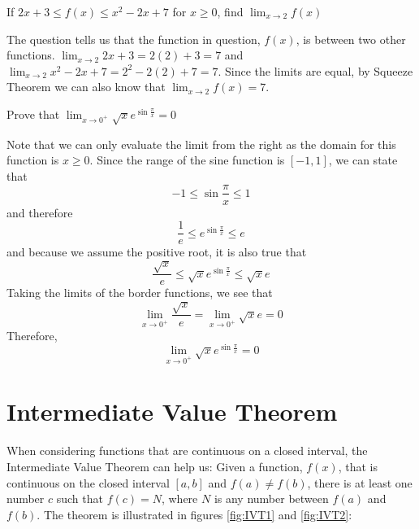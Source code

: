 \begin{Exercise}
    [title=Squeeze Theorem 2, label=squeeze2]
    If $2x+3 \leq f(x) \leq x^2-2x+7$ for $x \geq 0$, find $\lim_{x \to 2}f(x)$
    \vspace{40mm}
\end{Exercise}
\begin{Answer}
    [ref=squeeze2]
    The question tells us that the function in question, $f(x)$, is between 
    two other functions. $\lim_{x \to 2}2x+3 = 2(2)+3 = 7$ and $\lim_{x \to 2} 
    x^2 - 2x + 7 = 2^2 - 2(2) + 7 = 7$. Since the limits are equal, by Squeeze 
    Theorem we can also know that $\lim_{x \to 2}f(x) = 7$.
\end{Answer}

\begin{Exercise}
    [title= Squeeze Theorem 3, label=squeeze3]
    Prove that $\lim_{x \to 0^+}\sqrt{x}e^{\sin{\frac{\pi}{x}}} = 0$
    \vspace{40mm}
\end{Exercise}

\begin{Answer}
    [ref=squeeze3]
    Note that we can only evaluate the limit from the right as the domain for this 
    function is $x \geq 0$. Since the range of the sine function is $[-1,1]$, we 
    can state that $$-1 \leq \sin{\frac{\pi}{x}} \leq 1$$ 
    and therefore $$\frac{1}{e} \leq e^{\sin{\frac{\pi}{x}}} \leq e$$ and because 
    we assume the positive root, it is also true that $$\frac{\sqrt{x}}{e} \leq 
    \sqrt{x}e^{\sin{\frac{\pi}{x}}} \leq \sqrt{x}e$$ Taking the limits of the 
    border functions, we see that $$\lim_{x \to 0^+}\frac{\sqrt{x}}{e} = \lim_{x 
    \to 0^+}\sqrt{x}e = 0$$ Therefore, $$\lim_{x \to 0^+}\sqrt{x}e^{\sin{\frac{\pi}
    {x}}}=0$$
\end{Answer}


\section{Intermediate Value Theorem}
When considering functions that are continuous on a closed interval, the 
Intermediate Value Theorem can help us: Given a function, $f(x)$, that is 
continuous on the closed interval $\left[a, b\right]$ and $f(a) \neq f(b)$, 
there is at least one number $c$ such that $f(c) = N$, where $N$ is any number 
between $f(a)$ and $f(b)$. The theorem is illustrated in figures \ref{fig:IVT1} 
and \ref{fig:IVT2}:

